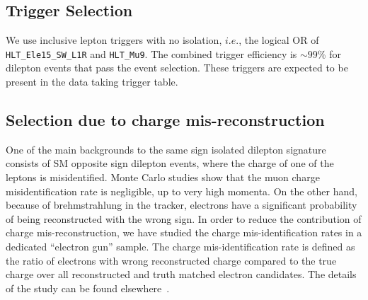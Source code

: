 \subsection{Trigger Selection}
\label{sec:trigger}
We use inclusive lepton triggers with no isolation, $i.e.$, the logical OR of {\tt HLT\_Ele15\_SW\_L1R} and {\tt HLT\_Mu9}.  
The combined trigger efficiency is $\sim 99$\% for dilepton events that pass the event selection.
These triggers are 
expected to be present in the data taking trigger table.

\subsection{Selection due to charge mis-reconstruction}
\label{sec:gsfctf}
One of the main backgrounds to the same sign isolated dilepton signature consists of 
SM opposite sign dilepton events, where the charge of one of the leptons is misidentified.
Monte Carlo studies show that the muon charge misidentification rate is negligible, up to very 
high momenta.  On the other hand, because of brehmstrahlung in the tracker, electrons have a 
significant probability of being reconstructed with the wrong sign. 
In order to reduce the contribution of charge mis-reconstruction, we have studied the 
charge mis-identification rates in a dedicated ``electron gun'' sample. The charge 
mis-identification rate is defined as the ratio of electrons with wrong reconstructed
charge compared to the true charge over all reconstructed and truth matched electron
candidates. The details of the study can be found elsewhere~\cite{ctfgsf}.  
\vspace{3 mm}
